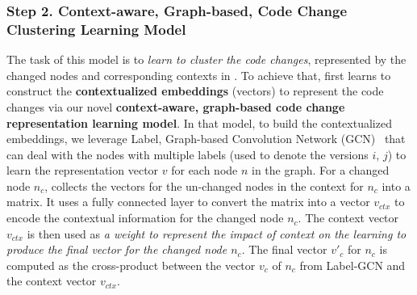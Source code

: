 
\subsubsection{{\bf Step 2. Context-aware, Graph-based, Code Change Clustering Learning Model}} The task of this model is to {\em learn to cluster the code changes}, represented by
the changed nodes and corresponding contexts in {\mvpdg}. To achieve
that, {\tool} first learns to construct the {\bf contextualized
  embeddings} (vectors) to represent the code changes via our novel
{\bf context-aware, graph-based code change representation learning
  model}. In that model, to build the contextualized embeddings, we
leverage Label, Graph-based Convolution Network (GCN)~\cite{yi} that
can deal with the nodes with multiple labels (used to denote the
versions $i$, $j$) to learn the representation vector $v$ for each
node $n$ in the graph. For a changed node $n_c$, {\tool} collects the
vectors for the un-changed nodes in the context for $n_c$ into a
matrix. It uses a fully connected layer to convert the matrix into a
vector $v_{ctx}$ to encode the contextual information for the changed
node $n_c$. The context vector $v_{ctx}$ is then used as {\em a weight
  to represent the impact of context on the learning to produce the
  final vector for the changed node $n_c$}. The final vector
$v'_c$ for $n_c$ is computed as the cross-product between the vector
$v_c$ of $n_c$ from Label-GCN and the context vector $v_{ctx}$.

